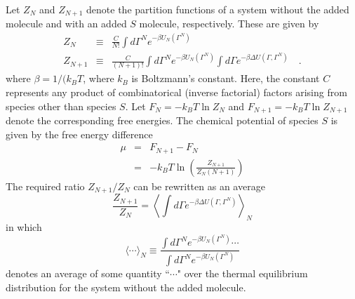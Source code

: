 \documentclass[12pt]{article}
\newcommand\system{\Gamma^{N}}
\newcommand\chain{\Gamma}
\newcommand\Usys{U_{N}}
\newcommand\delU{\Delta U}
\newcommand\Ztot{Z_{N+1}}
\newcommand\Zsystem{Z_{N}}
\newcommand\Ftot{F_{N+1}}
\newcommand\Fsystem{F_{N}}
\begin{document}
Let $\Zsystem$ and $\Ztot$ denote the partition functions of a system without the added molecule and with an added $S$ molecule, respectively. These are given by
\begin{eqnarray}
    \Zsystem & \equiv & \frac{C}{N!}\int d\system e^{-\beta \Usys(\system)} \\
    \Ztot  & \equiv & \frac{C}{(N+1)!}\int d\system e^{-\beta \Usys(\system)} 
                       \int d\chain e^{-\beta \delU(\chain, \system)}
    \quad.
\end{eqnarray}
where $\beta = 1/(k_{B}T$, where $k_{B}$ is Boltzmann's constant.  Here, the constant $C$ represents any product of combinatorical (inverse factorial) factors arising from species other than species $S$.  Let $\Fsystem = -k_{B}T\ln \Zsystem$ and $\Ftot = -k_{B}T\ln \Ztot$ denote the corresponding free energies.  The chemical potential of species $S$ is given by the free energy difference
\begin{eqnarray}
   \mu & = & \Ftot - \Fsystem \nonumber \\
       & = & -k_{B}T \ln \left ( \frac{\Ztot}{\Zsystem (N+1)} \right )
      \label{mudef}
\end{eqnarray}
The required ratio $\Ztot/\Zsystem$ can be rewritten as an average
\begin{equation}
  \frac{\Ztot}{\Zsystem} = 
  \left \langle \int d\chain e^{-\beta \delU(\chain, \system)} \right \rangle_{N}
\end{equation}
in which 
\begin{equation}
  \langle \cdots \rangle_{N} \equiv
  \frac{ \int d\system e^{-\beta \Usys(\system)} \cdots }
       { \int d\system e^{-\beta \Usys(\system)}}
\end{equation}
denotes an average of some quantity ``$\cdots$" over the thermal equilibrium 
distribution for the system without the added molecule. 
\end{document}
